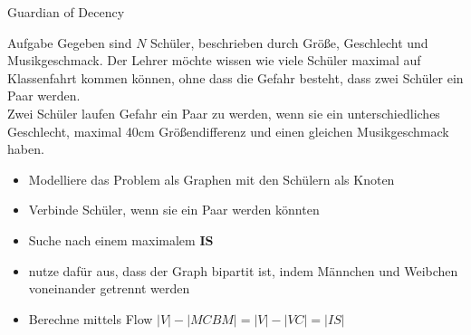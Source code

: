 \begin{frame}{Guardian of Decency}
	\vspace{-0.3cm}
	\begin{block}{Aufgabe}
		Gegeben sind $N$ Schüler, beschrieben durch Größe, Geschlecht und Musikgeschmack. Der Lehrer möchte wissen wie viele Schüler maximal auf Klassenfahrt kommen können, ohne dass die Gefahr besteht, dass zwei Schüler ein Paar werden.\\
		Zwei Schüler laufen Gefahr ein Paar zu werden, wenn sie ein unterschiedliches Geschlecht, maximal 40cm Größendifferenz und einen gleichen Musikgeschmack haben.
	\end{block}
	\begin{itemize}
		\setlength\itemsep{0.05em}
		\item Modelliere das Problem als Graphen mit den Schülern als Knoten
		\item Verbinde Schüler, wenn sie ein Paar werden könnten
		\item Suche nach einem maximalem \textbf{IS}
		\item nutze dafür aus, dass der Graph bipartit ist, indem Männchen und Weibchen voneinander getrennt werden
		\item Berechne mittels Flow $|V|-|MCBM|=|V|-|VC|=|IS|$
	\end{itemize}
\end{frame}